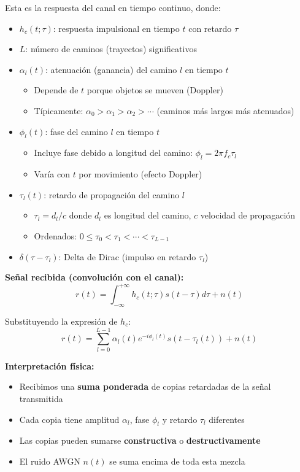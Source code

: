 \documentclass[10pt,a4paper]{article}
\begin{document}
Esta es la respuesta del canal en tiempo continuo, donde:
\begin{itemize}
\item $h_c(t;\tau)$: respuesta impulsional en tiempo $t$ con retardo $\tau$
\item $L$: número de caminos (trayectos) significativos
\item $\alpha_l(t)$: atenuación (ganancia) del camino $l$ en tiempo $t$
  \begin{itemize}
  \item Depende de $t$ porque objetos se mueven (Doppler)
  \item Típicamente: $\alpha_0 > \alpha_1 > \alpha_2 > \cdots$ (caminos más largos más atenuados)
  \end{itemize}
\item $\phi_l(t)$: fase del camino $l$ en tiempo $t$
  \begin{itemize}
  \item Incluye fase debido a longitud del camino: $\phi_l = 2\pi f_c \tau_l$
  \item Varía con $t$ por movimiento (efecto Doppler)
  \end{itemize}
\item $\tau_l(t)$: retardo de propagación del camino $l$
  \begin{itemize}
  \item $\tau_l = d_l / c$ donde $d_l$ es longitud del camino, $c$ velocidad de propagación
  \item Ordenados: $0 \leq \tau_0 < \tau_1 < \cdots < \tau_{L-1}$
  \end{itemize}
\item $\delta(\tau - \tau_l)$: Delta de Dirac (impulso en retardo $\tau_l$)
\end{itemize}

\textbf{Señal recibida (convolución con el canal):}
$$\boxed{r(t) = \int_{-\infty}^{+\infty} h_c(t;\tau) s(t-\tau) d\tau + n(t)}$$

Substituyendo la expresión de $h_c$:
$$\boxed{r(t) = \sum_{l=0}^{L-1} \alpha_l(t) e^{-i\phi_l(t)} s(t - \tau_l(t)) + n(t)}$$

\textbf{Interpretación física:}
\begin{itemize}
\item Recibimos una \textbf{suma ponderada} de copias retardadas de la señal transmitida
\item Cada copia tiene amplitud $\alpha_l$, fase $\phi_l$ y retardo $\tau_l$ diferentes
\item Las copias pueden sumarse \textbf{constructiva} o \textbf{destructivamente}
\item El ruido AWGN $n(t)$ se suma encima de toda esta mezcla
\end{itemize}
\end{document}
